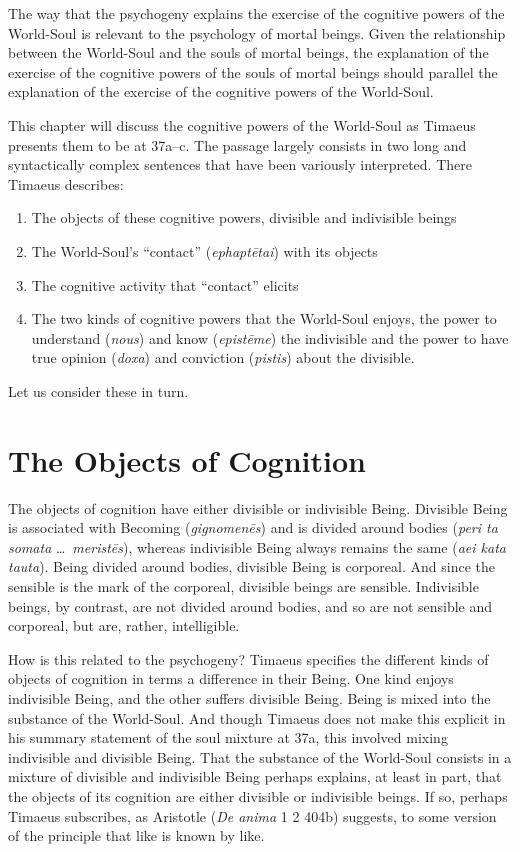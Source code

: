 The way that the psychogeny explains the exercise of the cognitive powers of the World-Soul is relevant to the psychology of mortal beings. Given the relationship between the World-Soul and the souls of mortal beings, the explanation of the exercise of the cognitive powers of the souls of mortal beings should parallel the explanation of the exercise of the cognitive powers of the World-Soul. 

This chapter will discuss the cognitive powers of the World-Soul as Timaeus presents them to be at 37a--c. The passage largely consists in two long and syntactically complex sentences that have been variously interpreted. There Timaeus describes:
\begin{enumerate}[(1)]
	\item The objects of these cognitive powers, divisible and indivisible beings
	\item The World-Soul's ``contact'' (\emph{ephaptētai}) with its objects
	\item The cognitive activity that ``contact'' elicits
	\item The two kinds of cognitive powers that the World-Soul enjoys, the power to understand (\emph{nous}) and know (\emph{epistēme}) the indivisible and the power to have true opinion (\emph{doxa}) and conviction (\emph{pistis}) about the divisible.
\end{enumerate}
Let us consider these in turn.


\section{The Objects of Cognition} %
\label{sec:the_objects_of_cognition}

The objects of cognition have either divisible or indivisible Being. Divisible Being is associated with Becoming (\emph{gignomenēs}) and is divided around bodies (\emph{peri ta somata} \ldots\ \emph{meristēs}), whereas indivisible Being always remains the same (\emph{aei kata tauta}). Being divided around bodies, divisible Being is corporeal. And since the sensible is the mark of the corporeal, divisible beings are sensible. Indivisible beings, by contrast, are not divided around bodies, and so are not sensible and corporeal, but are, rather, intelligible.

How is this related to the psychogeny? Timaeus specifies the different kinds of objects of cognition in terms a difference in their Being. One kind enjoys indivisible Being, and the other suffers divisible Being. Being is mixed into the substance of the World-Soul. And though Timaeus does not make this explicit in his summary statement of the soul mixture at 37a, this involved mixing indivisible and divisible Being. That the substance of the World-Soul consists in a mixture of divisible and indivisible Being perhaps explains, at least in part, that the objects of its cognition are either divisible or indivisible beings. If so, perhaps Timaeus subscribes, as Aristotle (\emph{De anima} 1 2 404b) suggests, to some version of the principle that like is known by like. 

